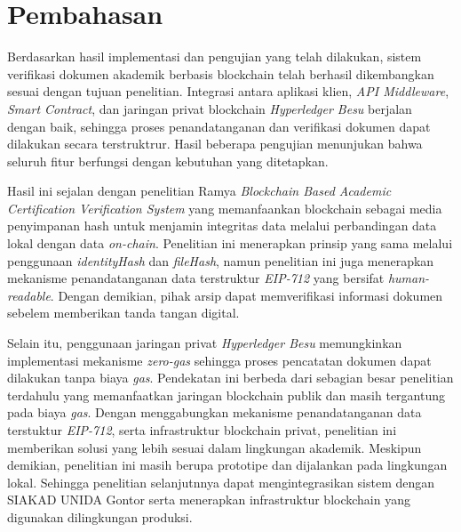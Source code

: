 	\section{Pembahasan}
	Berdasarkan hasil implementasi dan pengujian yang telah dilakukan, sistem verifikasi dokumen akademik berbasis blockchain telah berhasil dikembangkan sesuai dengan tujuan penelitian. Integrasi antara aplikasi klien, \textit{API Middleware}, \textit{Smart Contract}, dan jaringan privat blockchain \textit{Hyperledger Besu} berjalan dengan baik, sehingga proses penandatanganan dan verifikasi dokumen dapat dilakukan secara terstruktrur. Hasil beberapa pengujian menunjukan bahwa seluruh fitur berfungsi dengan kebutuhan yang ditetapkan.

	Hasil ini sejalan dengan penelitian Ramya \textit{Blockchain Based Academic Certification Verification System} yang memanfaankan blockchain sebagai media penyimpanan hash untuk menjamin integritas data melalui perbandingan data lokal dengan data \textit{on-chain}. Penelitian ini menerapkan prinsip yang sama melalui penggunaan \textit{identityHash} dan \textit{fileHash}, namun penelitian ini juga menerapkan mekanisme penandatanganan data terstruktur \textit{EIP-712} yang bersifat \textit{human-readable}. Dengan demikian, pihak arsip dapat memverifikasi informasi dokumen sebelem memberikan tanda tangan digital.

	Selain itu, penggunaan jaringan privat \textit{Hyperledger Besu} memungkinkan implementasi mekanisme \textit{zero-gas} sehingga proses pencatatan dokumen dapat dilakukan tanpa biaya \textit{gas}. Pendekatan ini berbeda dari sebagian besar penelitian terdahulu yang memanfaatkan jaringan blockchain publik dan masih tergantung pada biaya \textit{gas}. Dengan menggabungkan mekanisme penandatanganan data terstuktur \textit{EIP-712}, serta infrastruktur blockchain privat, penelitian ini memberikan solusi yang lebih sesuai dalam lingkungan akademik. Meskipun demikian, penelitian ini masih berupa prototipe dan dijalankan pada lingkungan lokal. Sehingga penelitian selanjutnnya dapat mengintegrasikan sistem dengan SIAKAD UNIDA Gontor serta menerapkan infrastruktur blockchain yang digunakan dilingkungan produksi.


		